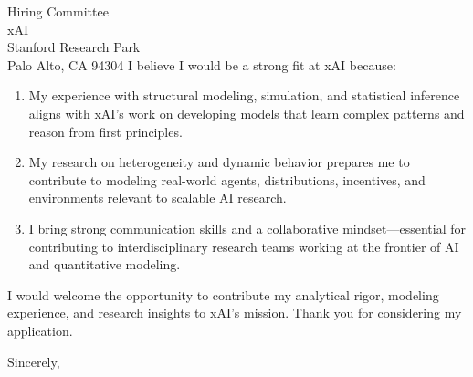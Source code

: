 \documentclass[11pt,letterpaper]{letter}
\begin{document}
\begin{letter}{Hiring Committee \\
xAI \\
Stanford Research Park \\
Palo Alto, CA 94304}
I believe I would be a strong fit at xAI because:
\begin{enumerate}
    \item My experience with structural modeling, simulation, and statistical inference aligns with xAI’s work on developing models that learn complex patterns and reason from first principles.
    \item My research on heterogeneity and dynamic behavior prepares me to contribute to modeling real-world agents, distributions, incentives, and environments relevant to scalable AI research.
    \item I bring strong communication skills and a collaborative mindset—essential for contributing to interdisciplinary research teams working at the frontier of AI and quantitative modeling.
\end{enumerate}

I would welcome the opportunity to contribute my analytical rigor, modeling experience, and research insights to xAI’s mission. Thank you for considering my application.

\closing{Sincerely,}

\end{letter}
\end{document}
